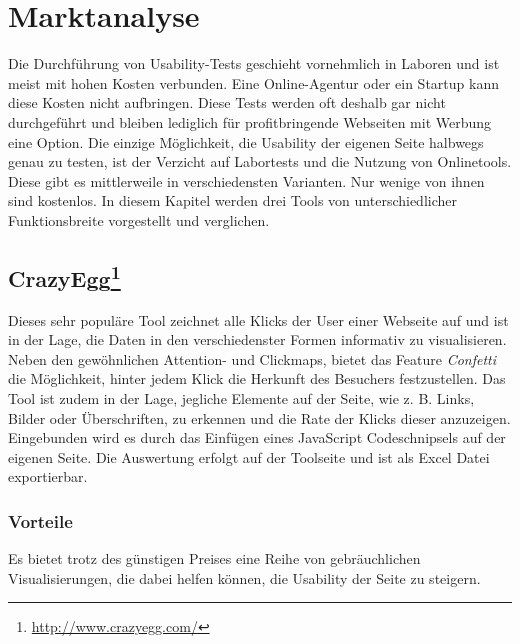 %
%
%
%

\section{Marktanalyse}

Die Durchführung von Usability-Tests geschieht vornehmlich in Laboren und ist meist mit hohen Kosten verbunden. Eine Online-Agentur oder ein Startup kann diese Kosten nicht aufbringen. Diese Tests werden oft deshalb gar nicht durchgeführt und bleiben lediglich für profitbringende Webseiten mit Werbung eine Option. Die einzige Möglichkeit, die Usability der eigenen Seite halbwegs genau zu testen, ist der Verzicht auf Labortests und die Nutzung von Onlinetools. Diese gibt es mittlerweile in verschiedensten Varianten. Nur wenige von ihnen sind kostenlos. In diesem Kapitel werden drei Tools von unterschiedlicher Funktionsbreite vorgestellt und verglichen.

\subsection*{CrazyEgg\footnote{\url{http://www.crazyegg.com/}}}

Dieses sehr populäre Tool zeichnet alle Klicks der User einer Webseite auf und ist in der Lage, die Daten in den verschiedenster Formen informativ zu visualisieren. Neben den gewöhnlichen Attention- und Clickmaps, bietet das Feature \textit{Confetti} die Möglichkeit, hinter jedem Klick die Herkunft des Besuchers festzustellen. Das Tool ist zudem in der Lage, jegliche Elemente auf der Seite, wie z. B. Links, Bilder oder Überschriften, zu erkennen und die Rate der Klicks dieser anzuzeigen. Eingebunden wird es durch das Einfügen eines JavaScript Codeschnipsels auf der eigenen Seite. Die Auswertung erfolgt auf der Toolseite und ist als Excel Datei exportierbar.

\subsubsection*{Vorteile}
Es bietet trotz des günstigen Preises eine Reihe von gebräuchlichen Visualisierungen, die dabei helfen können, die Usability der Seite zu steigern.

